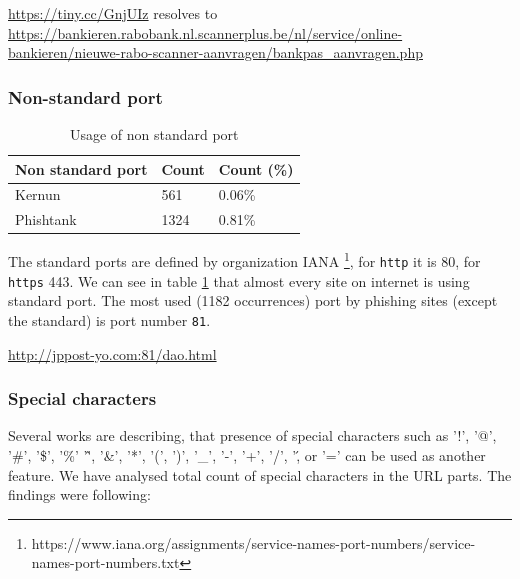\documentclass[
  digital, %
  oneside, %
  table,   %
  nolof,     %
  nolot,     %
]{fithesis3}
\newcounter{feature}
\newenvironment{feature}[1]{\stepcounter{feature}%
    \tcolorbox[beamer,%
    noparskip,breakable,
    colback=LightBlue,colframe=DarkBlue,%
    colbacklower=DarkBlue!75!LightBlue,%
    title=Feature~\thefeature: #1]}%
    {\endtcolorbox}
\begin{document}
\begin{feature}{Shortening service}
\url{https://tiny.cc/GnjUIz} \medbreak resolves to \\
\url{https://bankieren.rabobank.nl.scannerplus.be/nl/service/online-bankieren/nieuwe-rabo-scanner-aanvragen/bankpas_aanvragen.php}
\end{feature}


\subsubsection{Non-standard port \cite{fresh-phish}}

\begin{table}[]
\begin{tabular}{l|ll}
Non standard port & Count & Count (\%) \\ \hline
Kernun            & 561   & 0.06\%     \\
Phishtank         & 1324  & 0.81\%    
\end{tabular}
\caption{Usage of non standard port}
\label{table:non-std-port}
\end{table}

The standard ports are defined by organization IANA \footnote{https://www.iana.org/assignments/service-names-port-numbers/service-names-port-numbers.txt}, for \texttt{http} it is 80, for \texttt{https} 443. We can see in table \ref{table:non-std-port} that almost every site on internet is using standard port. The most used (1182 occurrences) port by phishing sites (except the standard) is port number \texttt{81}. 



\begin{feature}{Non-standard port}
\url{http://jppost-yo.com:81/dao.html}
\end{feature}

\subsubsection{Special characters}

Several works \cite{methodical-overview} \cite{novel-algorithm} \cite{malicious-url-detection} \cite{off-the-hook} are describing, that presence of special characters such as  '!', '@', '\#', '\$', '\%'
'\^', '\&', '*', '(', ')', '\_', '-', '+', '/', '\', or '=' can be used as another feature. We have analysed total count of special characters in the URL parts. The findings were following:

\end{document}
